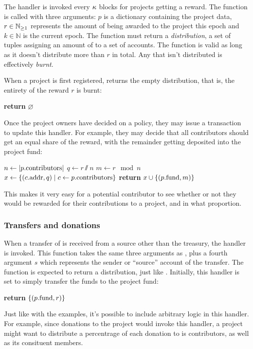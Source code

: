 The  handler is invoked every $\kappa$ blocks for
projects getting a reward. The function is called with three arguments: $p$ is
a dictionary containing the project data, $r \in \mathbb{N}_{\geq 1}$ represents the amount
of \oscoin{} being awarded to the project this epoch and $k \in \mathbb{N}$ is the
current epoch. The function must return a \emph{distribution}, a set of tuples
assigning an amount of \oscoin{} to a set of accounts. The function is valid
as long as it doesn't distribute more than $r$ \oscoin{} in total. Any \oscoin{}
that isn't distributed is effectively \emph{burnt}.

When a project is first registered,  returns the empty
distribution, that is, the entirety of the reward $r$ is burnt:
\begin{algorithmic}[0]
        \State \textbf{return} $\varnothing$
    \EndProcedure
\end{algorithmic}

\noindent Once the project owners have decided on a policy, they may issue a
transaction to update this handler. For example, they may decide that all
contributors should get an equal share of the reward, with the remainder
getting deposited into the project fund:

\begin{algorithmic}[0]
        \State $n \gets |p.{\mathrm{contributors}}|$
        \State $q \gets r \sslash n$
        \State $m \gets r \mod n$
        \State $x \gets \{ (c.{\mathrm{addr}}, q) \mid c \gets p.{\mathrm{contributors}} \}$
        \State \textbf{return} $x \cup \{ (p.{\mathrm{fund}}, m) \}$
    \EndProcedure
\end{algorithmic}
This makes it very easy for a potential contributor to see whether or not they
would be rewarded for their contributions to a project, and in what proportion.

\subsubsection{Transfers and donations}

When a transfer of \oscoin{} is received from a source other than the treasury,
the  handler is invoked. This function takes the same
three arguments as , plus a fourth argument $s$ which
represents the sender or ``source'' account of the transfer. The function is
expected to return a distribution, just like . Initially,
this handler is set to simply transfer the funds to the project fund:
\medskip
\begin{algorithmic}[0]
        \State \textbf{return} $\{ (p.{\mathrm{fund}}, r) \}$
    \EndProcedure
\end{algorithmic}
Just like with the  examples, it's possible to include
arbitrary logic in this handler. For example, since donations to the project
would invoke this handler, a project might want to distribute a percentrage
of each donation to is contributors, as well as its consituent members.

